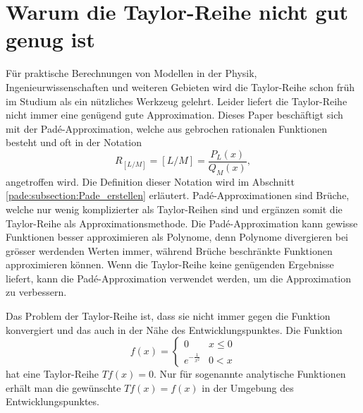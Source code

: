 %
%
%
\section{Warum die Taylor-Reihe nicht gut genug ist\label{pade:section:einleitung}}
%
Für praktische Berechnungen von Modellen in der Physik, Ingenieurwissenschaften und weiteren Gebieten wird die Taylor-Reihe schon früh im Studium als ein nützliches Werkzeug gelehrt.
%
%
%
%
Leider liefert die Taylor-Reihe nicht immer eine genügend gute Approximation.
Dieses Paper beschäftigt sich mit der Padé-Approximation, welche aus gebrochen rationalen Funktionen besteht und oft in der Notation
\begin{equation*}
R_{[L/M]}
=
[L/M]
=
\frac{P_{L}(x)}{Q_{M}(x)},
\end{equation*}
angetroffen wird. 
Die Definition dieser Notation wird im Abschnitt \ref{pade:subsection:Pade_erstellen} erläutert.
Padé-Appro\-xi\-ma\-tio\-nen sind Brüche, welche nur wenig komplizierter
als Taylor-Reihen sind und ergänzen somit die Taylor-Reihe als
Approximationsmethode.
Die Padé-Approximation kann gewisse Funktionen besser approximieren als Polynome, denn Polynome divergieren bei grösser werdenden Werten immer, während Brüche beschränkte Funktionen approximieren können.
Wenn die Taylor-Reihe keine genügenden Ergebnisse liefert, kann die Padé-Approximation verwendet werden, um die Approximation zu verbessern.


Das Problem der Taylor-Reihe ist, dass sie nicht immer gegen die Funktion konvergiert und das auch in der Nähe des Entwicklungspunktes.
Die Funktion 
\begin{equation}
f(x)
=
\left\{\begin{array}{cc}
0 & x\le 0  \\
e^{-\frac{1}{x^2}} & 0 < x
\end{array}\right.\end{equation}
hat eine Taylor-Reihe $Tf(x)=0$.
Nur für sogenannte analytische Funktionen erhält man die gewünschte $Tf(x)=f(x)$ in der Umgebung des Entwicklungspunktes. 

